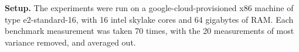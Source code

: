 \documentclass[sigconf,screen,review,natbib]{acmart}
\theoremstyle{definition}
\newtheorem{exmp}{Example}[section]
\begin{document}
\textbf{Setup.} The experiments were run on a google-cloud-provisioned x86 machine of type e2-standard-16, with 16 intel skylake cores and 64 gigabytes of RAM. Each
benchmark measurement was taken 70 times, with the 20 measurements of most variance removed, and averaged out.
\end{document}
